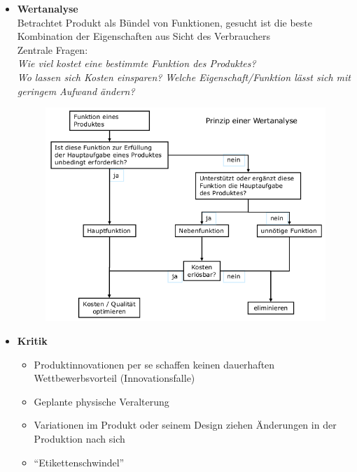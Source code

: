 \documentclass[a4paper,11pt, twoside]{article}
\begin{document}
\begin{itemize}
	\item \textbf{Wertanalyse}\\
Betrachtet Produkt als Bündel von Funktionen, gesucht ist die beste Kombination der Eigenschaften aus Sicht des Verbrauchers\\
Zentrale Fragen:\\
\textit{Wie viel kostet eine bestimmte Funktion des Produktes?}\\
\textit{Wo lassen sich Kosten einsparen?}
\textit{Welche Eigenschaft/Funktion lässt sich mit geringem Aufwand ändern?}
\begin{figure}[h]
 \begin{center}
   \includegraphics[scale=0.3]{bilder/wertanalyse.png}
 \end{center}
\end{figure}

	\item \textbf{Kritik}
\begin{itemize}
	\item Produktinnovationen per se schaffen keinen dauerhaften Wettbewerbsvorteil (Innovationsfalle)
	\item Geplante physische Veralterung
	\item Variationen im Produkt oder seinem Design ziehen Änderungen in der Produktion nach sich
	\item "`Etikettenschwindel"'
\end{itemize}

\end{itemize}
\end{document}
